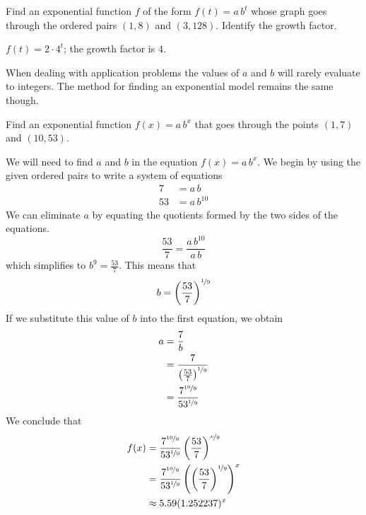 \begin{doyouunderstand}
	\begin{problem}
	Find an exponential function $f$ of the form $f(t)=a\,b^t$ whose graph goes through the ordered 
	pairs $(1,8)$ and $(3,128)$. Identify the growth factor.
	\begin{shortsolution}
		$f(t)=2\cdot 4^t$; the growth factor is $4$.
	\end{shortsolution}
	\end{problem}
\end{doyouunderstand}
			
When dealing with application problems the values of $a$ and $b$ will rarely evaluate to integers. 
The method for finding an exponential model remains the same though.
			
\begin{pccexample}
	Find an exponential function $f(x)=a\,b^x$ that goes through the points $(1,7)$ and $(10,53)$.
	\begin{pccsolution}
		We will need to find $a$ and $b$ in the equation $f(x)=a\,b^x$. We begin by using the given ordered pairs to write a system 
		of equations
		\begin{align*}
			7  & =  a\,b      \\
			53 & =  a\,b^{10} 
		\end{align*}
		We can eliminate $a$ by equating the quotients formed by the two sides of the equations.
		\begin{equation*}
			\frac{53}{7} = \frac{a\,b^{10}}{a\,b}
		\end{equation*}
		which simplifies to $b^9=\frac{53}{7}$. This means that 
		\[
			b = \left(\frac{53}{7}\right)^{\nicefrac{1}{9}}
		\]
		If we substitute this 
		value of $b$ into the first equation, we obtain
		\begin{align*}
			a & = \frac{7}{b}                                           \\
			  & = \frac{7}{\left(\frac{53}{7}\right)^{\nicefrac{1}{9}}} \\
			  & = \frac{7^{\nicefrac{10}{9}}}{53^{\nicefrac{1}{9}}}     
		\end{align*}
		We conclude that 
		\begin{align*}
			f(x) & = \frac{7^{\nicefrac{10}{9}}}{53^{\nicefrac{1}{9}}}\left(\frac{53}{7}\right)^{\nicefrac{x}{9}}                \\
			     & = \frac{7^{\nicefrac{10}{9}}}{53^{\nicefrac{1}{9}}}\left(\left(\frac{53}{7}\right)^{\nicefrac{1}{9}}\right)^x \\
			     & \approx 5.59 (1.252237)^x                                                                                     
		\end{align*}
	\end{pccsolution}
\end{pccexample}
			
